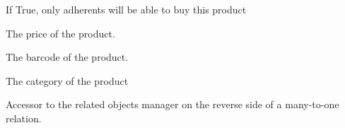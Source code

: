 \documentclass[letterpaper,10pt,english]{sphinxmanual}
\begin{document}
\begin{fulllineitems}

\begin{fulllineitems}
\label{\detokenize{modules/models:gestion.models.Product.adherentRequired}}
If True, only adherents will be able to buy this product

\end{fulllineitems}


\begin{fulllineitems}
\label{\detokenize{modules/models:gestion.models.Product.amount}}
The price of the product.

\end{fulllineitems}


\begin{fulllineitems}
\label{\detokenize{modules/models:gestion.models.Product.barcode}}
The barcode of the product.

\end{fulllineitems}


\begin{fulllineitems}
\label{\detokenize{modules/models:gestion.models.Product.category}}
The category of the product

\end{fulllineitems}


\begin{fulllineitems}
\label{\detokenize{modules/models:gestion.models.Product.consumption_set}}
Accessor to the related objects manager on the reverse side of a
many-to-one relation.


\end{fulllineitems}
\end{fulllineitems}
\end{document}
